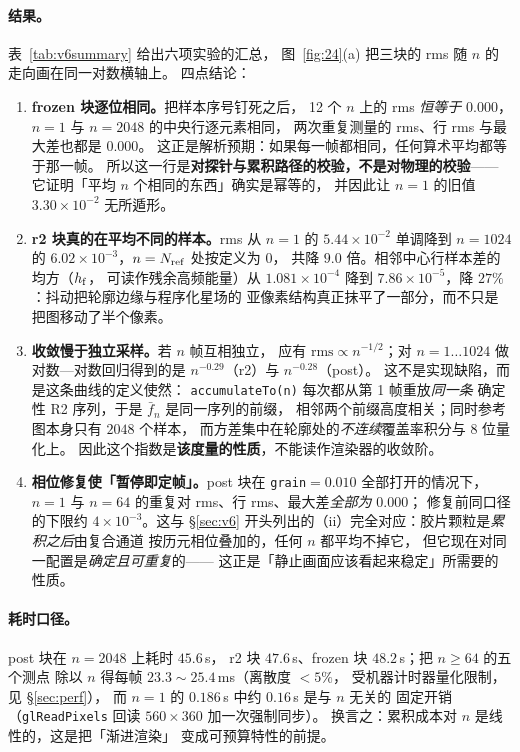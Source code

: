 \paragraph{结果。}表~\ref{tab:v6summary} 给出六项实验的汇总，
图~\ref{fig:24}(a) 把三块的 rms 随 $n$ 的走向画在同一对数横轴上。
四点结论：

\begin{enumerate}[leftmargin=1.5em,itemsep=2pt,topsep=3pt]
\item \textbf{frozen 块逐位相同。}把样本序号钉死之后，
12 个 $n$ 上的 rms \emph{恒等于} $0.000$，
$n=1$ 与 $n=2048$ 的中央行逐元素相同，
两次重复测量的 rms、行 rms 与最大差也都是 $0.000$。
这正是解析预期：如果每一帧都相同，任何算术平均都等于那一帧。
所以这一行是\textbf{对探针与累积路径的校验，不是对物理的校验}——
它证明「平均 $n$ 个相同的东西」确实是幂等的，
并因此让 $n=1$ 的旧值 $3.30\times10^{-2}$ 无所遁形。
\item \textbf{r2 块真的在平均不同的样本。}rms 从
$n=1$ 的 $5.44\times10^{-2}$ 单调降到 $n=1024$ 的
$6.02\times10^{-3}$，$n=N_{\rm ref}$ 处按定义为 0，
共降 $9.0$ 倍。相邻中心行样本差的均方（$h_{\rm f}$，
可读作残余高频能量）从 $1.081\times10^{-4}$ 降到
$7.86\times10^{-5}$，降 $27\%$：抖动把轮廓边缘与程序化星场的
亚像素结构真正抹平了一部分，而不只是把图移动了半个像素。
\item \textbf{收敛慢于独立采样。}若 $n$ 帧互相独立，
应有 $\mathrm{rms}\propto n^{-1/2}$；对 $n=1\ldots1024$
做对数—对数回归得到的是 $n^{-0.29}$（r2）与 $n^{-0.28}$（post）。
这不是实现缺陷，而是这条曲线的定义使然：
\texttt{accumulateTo(n)} 每次都从第 1 帧重放\emph{同一条}
确定性 R2 序列，于是 $\bar f_n$ 是同一序列的前缀，
相邻两个前缀高度相关；同时参考图本身只有 $2048$ 个样本，
而方差集中在轮廓处的\emph{不连续}覆盖率积分与 8 位量化上。
因此这个指数是\textbf{该度量的性质}，不能读作渲染器的收敛阶。
\item \textbf{相位修复使「暂停即定帧」。}post 块在
\texttt{grain}$=0.010$ 全部打开的情况下，
$n=1$ 与 $n=64$ 的重复对 rms、行 rms、最大差\emph{全部为} $0.000$；
修复前同口径的下限约 $4\times10^{-3}$。这与 \S\ref{sec:v6}
开头列出的（ii）完全对应：胶片颗粒是\emph{累积之后}由复合通道
按历元相位叠加的，任何 $n$ 都平均不掉它，
但它现在对同一配置是\emph{确定且可重复}的——
这正是「静止画面应该看起来稳定」所需要的性质。
\end{enumerate}

\paragraph{耗时口径。}post 块在 $n=2048$ 上耗时 $45.6$\,s，
r2 块 $47.6$\,s、frozen 块 $48.2$\,s；把 $n\ge64$ 的五个测点
除以 $n$ 得每帧 $23.3\sim25.4$\,ms（离散度 $<5\%$，
受机器计时器量化限制，见 \S\ref{sec:perf}），
而 $n=1$ 的 $0.186$\,s 中约 $0.16$\,s 是与 $n$ 无关的
固定开销（\texttt{glReadPixels} 回读 $560\times360$ 加一次强制同步）。
换言之：累积成本对 $n$ 是线性的，这是把「渐进渲染」
变成可预算特性的前提。

